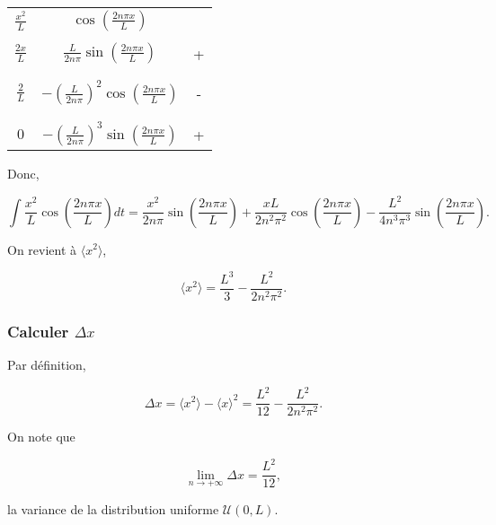 \documentclass[french]{article}
\begin{document}
{\begin{tcolorbox}[colback=yellow!5!white,colframe=yellow!75!black]
		 \begin{center}
		 	\begin{tabular}[5pt]{c c c}
		 		$\frac{x^2}{L}$ & $\cos\left(\frac{2n\pi x}{L} \right)$  &  \\ \\[-1em]
		 		$\frac{2x}{L}$& $\frac{L}{2n\pi}\sin\left(\frac{2n\pi x}{L} \right)$ &  +\\ \\[-1em]
		 		\\[-1em]
		 		$\frac{2}{L}$& $-\left(\frac{L}{2n\pi}\right)^2\cos\left(\frac{2n\pi x}{L} \right)$ &  -\\ \\[-1em]
		 		\\[-1em]
		 		$0$ & $-\left(\frac{L}{2n\pi}\right)^3\sin\left(\frac{2n\pi x}{L} \right)$  &  +\\ 
		 	\end{tabular}
		 \end{center}
		
		Donc,
		
		\begin{equation}
			\int \frac{x^2}{L}\cos\left(\frac{2n\pi x}{L} \right) dt = \frac{x^2}{2n\pi}\sin\left(\frac{2n\pi x}{L}\right) + \frac{xL}{2n^2\pi^2}\cos\left(\frac{2n\pi x}{L}\right) - \frac{L^2}{4n^3\pi^3}\sin\left(\frac{2n\pi x}{L}\right).
		\end{equation}
		
	\end{tcolorbox}

	On revient à $\langle x^2 \rangle$,
	
	\begin{equation}
		\langle x^2 \rangle = \frac{L^3}{3} - \frac{L^2}{2n^2\pi^2}.
	\end{equation}
	
	\subsubsection*{Calculer $\Delta x$}
	
	Par définition,
	
	\begin{equation}
		\Delta x = \langle x^2 \rangle - \langle x \rangle^2 = \frac{L^2}{12} - \frac{L^2}{2n^2\pi^2}.
	\end{equation}
	
	On note que
	
	\begin{equation}
		\lim_{n \to +\infty} \Delta x = \frac{L^2}{12},
	\end{equation}
	
	la variance de la distribution uniforme $\mathcal{U}(0, L)$.
	}
\end{document}
